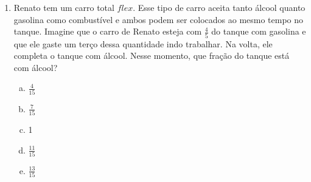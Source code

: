 \documentclass[a4paper,14pt]{article}
\begin{document}
\begin{multicols}{2}
\begin{enumerate}
			\item Renato tem um carro total $flex$. Esse tipo de carro aceita tanto álcool quanto gasolina como combustível e ambos podem ser colocados ao mesmo tempo no tanque. Imagine que o carro de Renato esteja com $\frac{4}{5}$ do tanque com gasolina e que ele gaste um terço dessa quantidade indo trabalhar. Na volta, ele completa o tanque com álcool. Nesse momento, que fração do tanque está com álcool?
			\begin{enumerate}[a)]
				\item $\frac{4}{15}$
				\item $\frac{7}{15}$
				\item 1
				\item $\frac{11}{15}$
				\item $\frac{13}{15}$
			\end{enumerate}
		\end{enumerate}
	\end{multicols}
\end{document}
